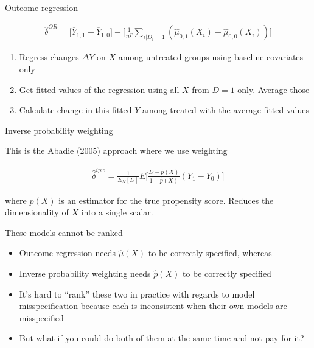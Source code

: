 \documentclass{beamer}
\begin{document}
\begin{frame}{Outcome regression}

\begin{eqnarray*}
\widehat{\delta}^{OR} = \bigg [ \overline{Y}_{1,1} -  \overline{Y}_{1,0} \bigg ] -  \bigg [ \frac{1}{n^T} \sum_{i|D_i=1} ( \widehat{\mu}_{0,1}(X_i) - \widehat{\mu}_{0,0}(X_i)) \bigg ]
\end{eqnarray*}

\begin{enumerate}
\item Regress changes $\Delta Y$ on $X$ among untreated groups using baseline covariates only
\item Get fitted values of the regression using all $X$ from $D=1$ only.  Average those
\item Calculate change in this fitted $Y$ among treated with the average fitted values
\end{enumerate}

\end{frame}

\begin{frame}{Inverse probability weighting}

This is the Abadie (2005) approach where we use weighting

\begin{eqnarray*}
\widehat{\delta}^{ipw} = \frac{1}{E_N[D]} E \bigg [ \frac{D-\widehat{p}(X)}{1-\widehat{p}(X)} (Y_1-Y_0) \bigg ]
\end{eqnarray*}

where $\widehat{p}(X)$ is an estimator for the true propensity score. Reduces the dimensionality of $X$ into a single scalar.

\end{frame}

\begin{frame}{These models cannot be ranked}

\begin{itemize}
\item Outcome regression needs $\widehat{\mu}(X)$ to be correctly specified, whereas
\item Inverse probability weighting needs $\widehat{p}(X)$ to be correctly specified
\item It's hard to ``rank'' these two in practice with regards to model misspecification because each is inconsistent when their own models are misspecified
\item But what if you could do both of them at the same time and not pay for it?
\end{itemize}

\end{frame}
\end{document}
